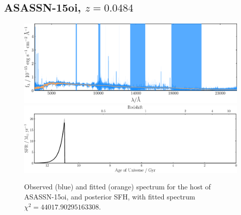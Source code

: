 \documentclass[a4paper,12pt]{article}
\begin{document}


\newpage
\subsection{ASASSN-15oi, $z=0.0484$}\label{sec:ASASSN-15oi}
\begin{figure}[h]
  \centering
  \includegraphics[width=\textwidth]{ASASSN15oi_spec}
  \includegraphics[width=\textwidth]{ASASSN15oi_sfh}
  \caption{
  Observed (blue) and fitted (orange) spectrum for the host of ASASSN-15oi, and
  posterior SFH, with fitted spectrum $\chi^2=44017.90295163308$.
  }
  \label{fig:ASASSN15oi_sfh}
\end{figure}
\end{document}
